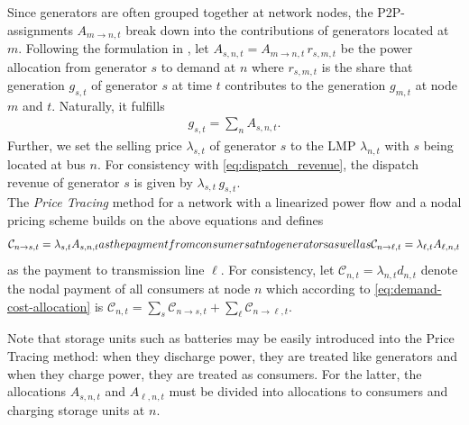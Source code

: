 \documentclass[11pt,twocolumn]{article}
\newcommand{\generation}{g_{s,t}}
\newcommand{\nodalgeneration}[1][n]{g_{#1,t}}
\newcommand{\lmp}[1][n]{\lambda_{#1,t}}
\newcommand{\demand}[1][n]{d_{#1,t}}
\newcommand{\cost}{\mathcal{C}}
\newcommand{\payment}[1][n]{\cost_{#1,t}}
\newcommand{\allocategeneration}[1][s, n]{A_{#1,t}}
\newcommand{\allocatepeer}[1][m \rightarrow n]{A_{#1,t}}
\newcommand{\allocateflow}[1][n]{A_{\ell,#1,t}}
\newcommand{\allocategeneratorcost}[1][n \rightarrow s]{\cost_{#1, t}}
\newcommand{\allocatelinecost}[1][n \rightarrow \ell]{\cost_{#1, t}}
\begin{document}
Since generators are often grouped together at network nodes, the \ac{P2P}-assignments $\allocatepeer$ break down into the contributions of generators located at $m$. Following the formulation in \cite{schafer_tracing_2020}, let $\allocategeneration = \allocatepeer \, r_{s,m,t}$ be the power allocation from generator $s$ to demand at $n$ where $r_{s,m,t}$ is the share that generation $\generation$ of generator $s$ at time $t$ contributes to the generation $\nodalgeneration[m]$ at node $m$ and $t$. Naturally, it fulfills
\begin{align}
    \generation = \sum_n \allocategeneration .
    \label{eq:generation-breakdown}
\end{align}  
Further, we set the selling price $\lmp[s]$ of generator $s$ to the \ac{LMP} $\lmp$ with $s$ being located at bus $n$. For consistency with \cref{eq:dispatch_revenue}, the dispatch revenue of generator $s$ is given by $\lmp[s] \, \generation$.\\


The \textit{Price Tracing} method for a network with a linearized power flow and a nodal pricing scheme builds on the above equations and defines  
\begin{subequations}
    \begin{align}
    \allocategeneratorcost = \lmp[s] \allocategeneration
\end{align}
as the payment from consumers at $n$ to generator $s$ as well as  
\begin{align}
    \allocatelinecost = \lmp[\ell] \allocateflow
\end{align}
\end{subequations}
as the payment to transmission line $\ell$. For consistency, let $\payment = \lmp \demand$ denote the nodal payment of all consumers at node $n$ which according to \cref{eq:demand-cost-allocation} is $\payment = \sum_s \allocategeneratorcost + \sum_\ell \allocatelinecost$. 

Note that storage units such as batteries may be easily introduced into the Price Tracing method: when they discharge power, they are treated like generators and when they charge power, they are treated as consumers. For the latter, the allocations $\allocategeneration$ and $\allocateflow$ must be divided into allocations to consumers and charging storage units at $n$.    

\end{document}
